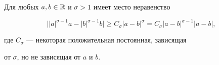 \begin{lem}


Для любых $a,b\in\Bbb R$ и $\sigma>1$ имеет место неравенство


$$


\big||a|^{\sigma-1}a-|b|^{\sigma-1}b\big|\ge


C_\sigma|a-b|^\sigma=C_\sigma|a-b|^{\sigma-1}|a-b|,


$$


где $C_\sigma$ --- некоторая положительная постоянная, зависящая


от $\sigma$, но не зависящая от $a$ и $b$. \label{L1}


\end{lem}








